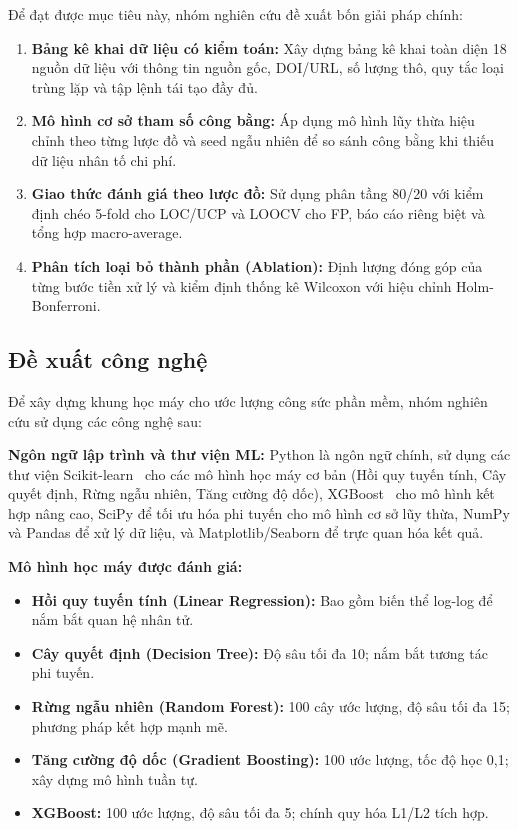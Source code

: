 \documentclass[12pt,a4paper]{article}
\begin{document}
Để đạt được mục tiêu này, nhóm nghiên cứu đề xuất bốn giải pháp chính:

\begin{enumerate}[leftmargin=2em]
    \item \textbf{Bảng kê khai dữ liệu có kiểm toán:} Xây dựng bảng kê khai toàn diện 18 nguồn dữ liệu với thông tin nguồn gốc, DOI/URL, số lượng thô, quy tắc loại trùng lặp và tập lệnh tái tạo đầy đủ.
    \item \textbf{Mô hình cơ sở tham số công bằng:} Áp dụng mô hình lũy thừa hiệu chỉnh theo từng lược đồ và seed ngẫu nhiên để so sánh công bằng khi thiếu dữ liệu nhân tố chi phí.
    \item \textbf{Giao thức đánh giá theo lược đồ:} Sử dụng phân tầng 80/20 với kiểm định chéo 5-fold cho LOC/UCP và LOOCV cho FP, báo cáo riêng biệt và tổng hợp macro-average.
    \item \textbf{Phân tích loại bỏ thành phần (Ablation):} Định lượng đóng góp của từng bước tiền xử lý và kiểm định thống kê Wilcoxon với hiệu chỉnh Holm-Bonferroni.
\end{enumerate}

\subsection{Đề xuất công nghệ}

Để xây dựng khung học máy cho ước lượng công sức phần mềm, nhóm nghiên cứu sử dụng các công nghệ sau:

\textbf{Ngôn ngữ lập trình và thư viện ML:}
Python là ngôn ngữ chính, sử dụng các thư viện Scikit-learn~\cite{virtanen2020scipy} cho các mô hình học máy cơ bản (Hồi quy tuyến tính, Cây quyết định, Rừng ngẫu nhiên, Tăng cường độ dốc), XGBoost~\cite{chen2016xgboost} cho mô hình kết hợp nâng cao, SciPy để tối ưu hóa phi tuyến cho mô hình cơ sở lũy thừa, NumPy và Pandas để xử lý dữ liệu, và Matplotlib/Seaborn để trực quan hóa kết quả.

\textbf{Mô hình học máy được đánh giá:}
\begin{itemize}[leftmargin=2em]
    \item \textbf{Hồi quy tuyến tính (Linear Regression):} Bao gồm biến thể log-log để nắm bắt quan hệ nhân tử.
    \item \textbf{Cây quyết định (Decision Tree):} Độ sâu tối đa 10; nắm bắt tương tác phi tuyến.
    \item \textbf{Rừng ngẫu nhiên (Random Forest):} 100 cây ước lượng, độ sâu tối đa 15; phương pháp kết hợp mạnh mẽ.
    \item \textbf{Tăng cường độ dốc (Gradient Boosting):} 100 ước lượng, tốc độ học 0,1; xây dựng mô hình tuần tự.
    \item \textbf{XGBoost:} 100 ước lượng, độ sâu tối đa 5; chính quy hóa L1/L2 tích hợp.
\end{itemize}
\end{document}
